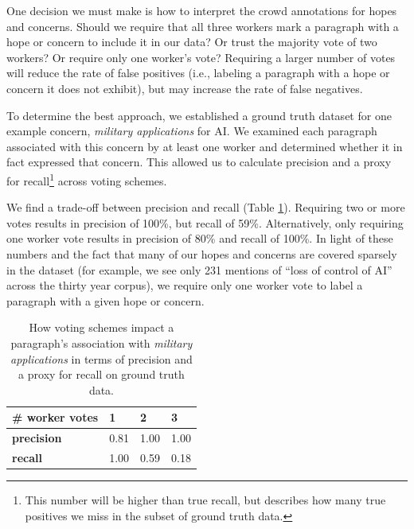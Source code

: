 \documentclass[letterpaper]{article}
\begin{document}
One decision we must make is how to interpret the crowd annotations for  hopes and concerns. Should we require that all three workers mark a paragraph with a hope or concern to include it in our data? Or trust the majority vote of two workers? Or require only one worker's vote? Requiring a larger number of votes will reduce the rate of false positives (i.e., labeling a paragraph with a hope or concern it does not exhibit), but may increase the rate of false negatives.

To determine the best approach, we established a ground truth dataset for one example concern, \textit{military applications} for  AI. We examined each paragraph associated with this concern by at least one worker and determined whether it in fact expressed that concern. This allowed us to calculate precision and
a proxy for recall\footnote{This number will be higher than true recall, but describes how many true positives we miss in the subset of ground truth data.} across voting schemes.

We find a trade-off between precision and recall (Table \ref{tbl:rates}). Requiring two or more votes results in precision of 100\%, but recall of 59\%. Alternatively, only requiring one worker vote results in precision of 80\% and recall of 100\%. In light of these numbers and the fact that many of our hopes and concerns are covered sparsely in the dataset (for example, we see only 231 mentions of ``loss of control of AI'' across the thirty year corpus), we require only one worker vote to label a paragraph with a given hope or concern.

\begin{table}[!ht]
  \renewcommand{\arraystretch}{1.3}
  \begin{tabular}{p{8.5em}p{3em}p{3em}p{3em}}
   \textbf{\# worker votes} & 1 & 2 & 3\\
   \hline
   \textbf{precision} & 0.81 & 1.00 & 1.00 \\
   \textbf{recall} & 1.00 & 0.59 & 0.18 \\

  \end{tabular}
  \caption{How voting schemes impact a paragraph's association with \textit{military applications} in terms of precision and a proxy for recall on ground truth data. %
  }
  \label{tbl:rates}
\end{table}
\end{document}
